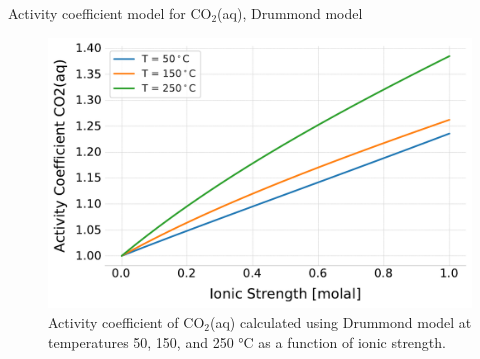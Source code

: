 %
%
\begin{frame}{Activity coefficient model for CO$_{2}$(aq), Drummond model}

\begin{figure}
\centering{}\includegraphics[height=0.8\textheight]{figures/activity-models/activity-coefficient-co2-drummond}
\caption{Activity coefficient of CO$_{2}$(aq) calculated using Drummond model
at temperatures 50, 150, and 250 °C as a function of ionic strength.}
\end{figure}

\end{frame}
%
%
%
